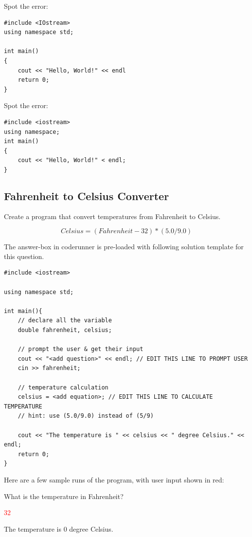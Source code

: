 \begin{multipart}
Spot the error:

    \begin{verbatim}
#include <IOstream> 
using namespace std;

int main() 
{
    cout << "Hello, World!" << endl
    return 0; 
} 
    \end{verbatim}
\end{multipart}

\begin{multipart}
Spot the error:

    \begin{verbatim}
#include <iostream> 
using namespace;
int main() 
{
    cout << "Hello, World!" < endl; 
}
    \end{verbatim}
\end{multipart}

\subsection{Fahrenheit to Celsius Converter}

Create a program that convert temperatures from Fahrenheit to Celsius.

$$Celsius = (Fahrenheit - 32) * (5.0 / 9.0)$$

The answer-box in coderunner is pre-loaded with following solution template for this question.

\begin{verbatim}
#include <iostream>

using namespace std;

int main(){
    // declare all the variable
    double fahrenheit, celsius;

    // prompt the user & get their input
    cout << "<add question>" << endl; // EDIT THIS LINE TO PROMPT USER
    cin >> fahrenheit;

    // temperature calculation
    celsius = <add equation>; // EDIT THIS LINE TO CALCULATE TEMPERATURE
    // hint: use (5.0/9.0) instead of (5/9)

    cout << "The temperature is " << celsius << " degree Celsius." << endl;
    return 0;
}
\end{verbatim}

Here are a few sample runs of the program, with user input shown in red:

\begin{sample}
What is the temperature in Fahrenheit? 

\textcolor{red}{32}

The temperature is 0 degree Celsius.
\end{sample}

